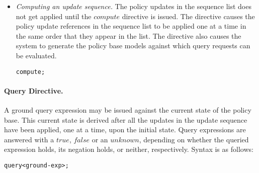 \documentclass[global,twocolumn,draft]{svjour}
\newenvironment{vverbatim}
  {\begin{alltt}}
  {\vspace{-\baselineskip}\end{alltt}}
\begin{document}
\begin{itemize}
          \item
            {\em Computing an update sequence.}
            The policy updates in the sequence list does not get applied until
            the $compute$ directive is issued. The directive causes the policy
            update references in the sequence list to be applied one at a time
            in the same order that they appear in the list. The directive also
            causes the system to generate the policy base models against which
            query requests can be evaluated.

            \begin{vverbatim}
  compute;
            \end{vverbatim}
        \end{itemize}

        \paragraph{Query Directive.}

          A ground query expression may be issued against the current state of
          the policy base. This current state is derived after all the updates
          in the update sequence have been applied, one at a time, upon the
          initial state. Query expressions are answered with a $true$, $false$
          or an $unknown$, depending on whether the queried expression holds,
          its negation holds, or neither, respectively. Syntax is as follows:

          \begin{vverbatim}
  query <ground-exp>;
          \end{vverbatim}
\end{document}
